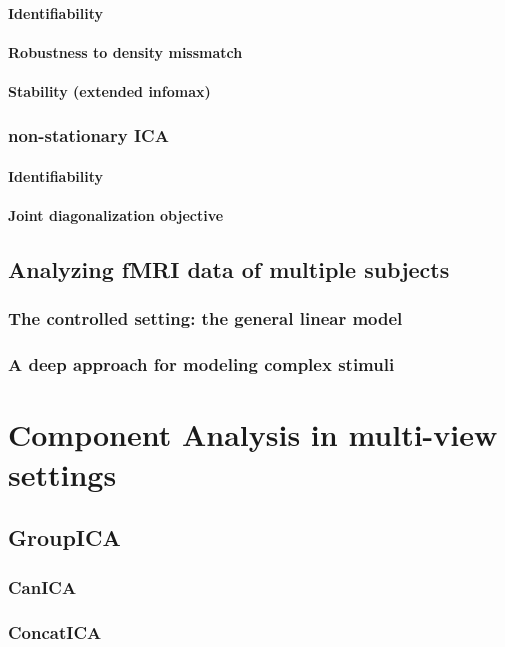 \documentclass[12pt]{report}
\begin{document}
\subsubsection{Identifiability}
\subsubsection{Robustness to density missmatch}
\subsubsection{Stability (extended infomax)}
\subsection{non-stationary ICA}
\subsubsection{Identifiability}
\subsubsection{Joint diagonalization objective}
\section{Analyzing fMRI data of multiple subjects}
\subsection{The controlled setting: the general linear model}
\subsection{A deep approach for modeling complex stimuli}
\chapter{Component Analysis in multi-view settings}
\section{GroupICA}
\subsection{CanICA}
\subsection{ConcatICA}
\end{document}
